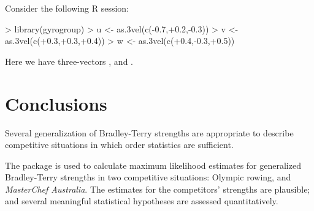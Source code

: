 \documentclass[nojss]{jss}
\begin{document}
Consider the following R session:

\begin{Schunk}
\begin{Sinput}
> library(gyrogroup)
> u <- as.3vel(c(-0.7,+0.2,-0.3))
> v <- as.3vel(c(+0.3,+0.3,+0.4))
> w <- as.3vel(c(+0.4,-0.3,+0.5))
\end{Sinput}
\end{Schunk}

Here we have three-vectors ,  and .


\section{Conclusions}

Several generalization of Bradley-Terry strengths are appropriate to
describe competitive situations in which order statistics are
sufficient.

The package is used to calculate maximum likelihood estimates for
generalized Bradley-Terry strengths in two competitive situations:
Olympic rowing, and \emph{MasterChef Australia}.  The estimates for
the competitors' strengths are plausible; and several meaningful
statistical hypotheses are assessed quantitatively.


\end{document}
